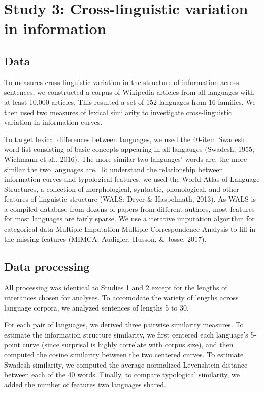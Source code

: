 \documentclass[10pt, letterpaper]{article}
\begin{document}
\hypertarget{study-3-cross-linguistic-variation-in-information}{%
\section{Study 3: Cross-linguistic variation in
information}\label{study-3-cross-linguistic-variation-in-information}}

\hypertarget{data-2}{%
\subsection{Data}\label{data-2}}

To measures cross-linguistic variation in the structure of information
across sentences, we constructed a corpus of Wikipedia articles from all
languages with at least 10,000 articles. This resulted a set of 152
languages from 16 families. We then used two measures of lexical
similarity to investigate cross-linguistic variation in information
curves.

To target lexical differences between languages, we used the 40-item
Swadesh word list consisting of basic concepts appearing in all
langauges (Swadesh, 1955; Wichmann et al., 2016). The more similar two
languages' words are, the more similar the two languages are. To
understand the relationship between information curves and typological
features, we used the World Atlas of Language Structures, a collection
of morphological, syntactic, phonological, and other features of
linguistic structure (WALS; Dryer \& Haspelmath, 2013). As WALS is a
compiled database from dozens of papers from different authors, most
features for most languages are fairly sparse. We use a iterative
imputation algorithm for categorical data Multiple Imputation Multiple
Correspondence Analysis to fill in the missing features (MIMCA;
Audigier, Husson, \& Josse, 2017).

\hypertarget{data-processing-1}{%
\subsection{Data processing}\label{data-processing-1}}

All processing was identical to Studies 1 and 2 except for the lengths
of utterances chosen for analyses. To accomodate the variety of lengths
across language corpora, we analyzed sentences of lengths 5 to 30.

For each pair of languages, we derived three pairwise similarity
measures. To estimate the information structure similarity, we first
centered each language's 5-point curve (since surprisal is highly
correlate with corpus size), and then computed the cosine similarity
between the two centered curves. To estimate Swadesh similarity, we
computed the average normalized Levenshtein distance between each of the
40 words. Finally, to compare typological similarity, we added the
number of features two languages shared.
\end{document}
